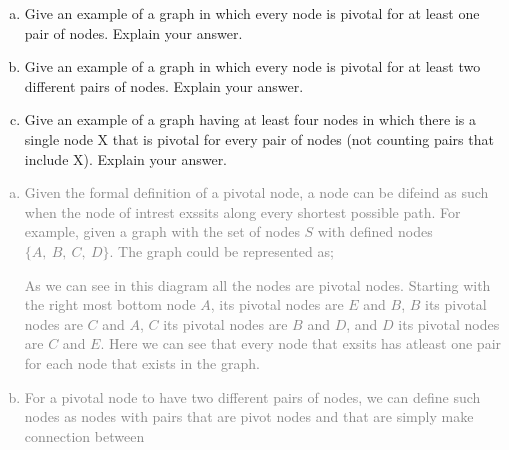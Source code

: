 \documentclass[11pt]{article}
\begin{document}
\begin{enumerate}
	\begin{enumerate}[(a)]
		\item  Give an example of a graph in which every node is pivotal for at least one pair of nodes. Explain your answer.
		\item Give an example of a graph in which every node is pivotal for at least two different pairs of nodes. Explain your answer.
		\item  Give an example of a graph having at least four nodes in which there is a single
node X that is pivotal for every pair of nodes (not counting pairs that include X). Explain your answer.
	\end{enumerate}
\textcolor{gray}{
\begin{enumerate}[(a)]
\item  Given the formal definition of a pivotal node, a node can be difeind as such when the node of intrest exssits along every shortest possible path.  For example, given a graph with the set of nodes $S$ with defined nodes $\{A, \ B, \ C, \ D\}$.  The graph could be represented as;\\
\begin{center}
\end{center}
As we can see in this diagram all the nodes are pivotal nodes.   Starting with the right most bottom node $A$, its pivotal nodes are $E$ and $B$, $B$ its pivotal nodes are $C$ and $A$, $C$ its pivotal nodes are $B$ and $D$,  and $D$ its pivotal nodes are $C$ and $E$.  Here we can see that every node that exsits has atleast one pair for each node that exists in the graph.\\
\item For a pivotal node to have two different pairs of nodes, we can define such nodes as nodes with pairs that are pivot nodes and that are simply make connection between  
\begin{center}
\end{center}
\end{enumerate}}
\end{enumerate}
\end{document}

